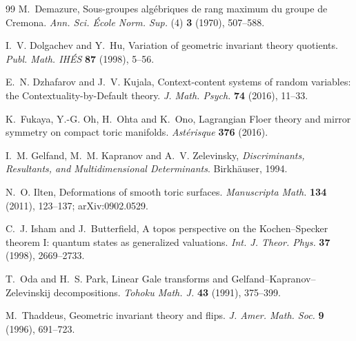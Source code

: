 \documentclass[11pt]{article}
\theoremstyle{definition}
\theoremstyle{remark}
\begin{document}
\begin{thebibliography}{99}
M.~Demazure, Sous-groupes algébriques de rang maximum du groupe de Cremona. \emph{Ann. Sci. École Norm. Sup.} (4) \textbf{3} (1970),
507--588.

I.~V. Dolgachev and Y.~Hu, Variation of geometric invariant theory quotients. \emph{Publ. Math. IHÉS} \textbf{87} (1998), 5--56.

E.~N. Dzhafarov and J.~V. Kujala, Context-content systems of random variables: the Contextuality-by-Default theory.
\emph{J. Math. Psych.} \textbf{74} (2016), 11--33.

K.~Fukaya, Y.-G. Oh, H.~Ohta and K.~Ono, Lagrangian Floer theory and mirror symmetry on compact toric manifolds. \emph{Astérisque}
\textbf{376} (2016).

I.~M. Gelfand, M.~M. Kapranov and A.~V. Zelevinsky, \emph{Discriminants, Resultants, and Multidimensional Determinants}.
Birkhäuser, 1994.

N.~O. Ilten, Deformations of smooth toric surfaces. \emph{Manuscripta Math.} \textbf{134} (2011), 123--137; arXiv:0902.0529.

C.~J. Isham and J.~Butterfield, A topos perspective on the Kochen--Specker theorem {I}: quantum states as generalized valuations.
\emph{Int. J. Theor. Phys.} \textbf{37} (1998), 2669--2733.

T.~Oda and H.~S. Park, Linear Gale transforms and Gelfand--Kapranov--Zelevinskij decompositions. \emph{Tohoku Math. J.} \textbf{43}
(1991), 375--399.

M.~Thaddeus, Geometric invariant theory and flips. \emph{J. Amer. Math. Soc.} \textbf{9} (1996), 691--723.

\end{thebibliography}
\end{document}
